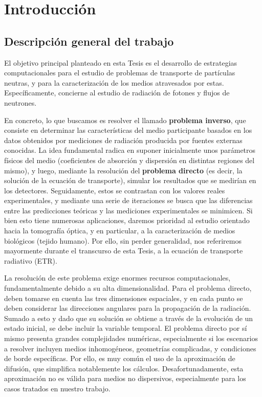 
\pagestyle{fancy}
\lhead{\thepage}
\chapter{Introducción}
\vspace{0.01\textheight}


\clearpage \pagebreak  \section{Descripción general del trabajo}  

El objetivo principal planteado en esta Tesis es el desarrollo 
de estrategias computacionales para el 
estudio de problemas de transporte de partículas neutras, y para la 
caracterización de los medios atravesados por estas.
Específicamente, concierne al estudio de radiación de fotones y 
flujos de neutrones.

En concreto, lo que buscamos es resolver el llamado  
{\bf problema inverso}, que consiste en determinar las características 
del medio participante basados en los datos obtenidos por mediciones 
de radiación producida por fuentes externas conocidas.
La idea fundamental radica en suponer inicialmente unos parámetros 
físicos del medio (coeficientes de absorción y dispersión en distintas 
regiones del mismo), y luego, mediante la resolución del {\bf problema 
directo} (es decir, la solución de la ecuación de transporte), 
simular los resultados que se medirían en los detectores. 
Seguidamente, estos se contrastan con los valores reales experimentales, 
y mediante una serie de iteraciones se busca que las diferencias 
entre las predicciones teóricas y las mediciones experimentales 
se minimicen.
Si bien esto tiene numerosas aplicaciones, daremos prioridad al estudio 
orientado hacia la tomografía óptica, y en particular, a la 
caracterización de medios biológicos (tejido humano). 
Por ello, sin perder generalidad, nos referiremos mayormente 
durante el transcurso de esta Tesis, a la ecuación de transporte radiativo (ETR).

La resolución de este problema exige enormes recursos computacionales, 
fundamentalmente debido a su alta dimensionalidad.
Para el problema directo, deben tomarse en cuenta las tres dimensiones 
espaciales, y en cada punto se deben considerar las direcciones 
angulares para la propagación de la radiación. 
Sumado a esto y dado que su solución se obtiene a través de la 
evolución de un estado inicial, se debe incluir la variable temporal.
El problema directo por sí mismo presenta grandes complejidades 
numéricas, especialmente si los escenarios a resolver incluyen 
medios inhomogéneos, geometrías complicadas, y condiciones de 
borde específicas.
Por ello, es muy común el uso de la aproximación de difusión, 
que simplifica notablemente los cálculos. 
Desafortunadamente, esta aproximación no es válida para medios 
no dispersivos, especialmente para los casos tratados en nuestro trabajo.

